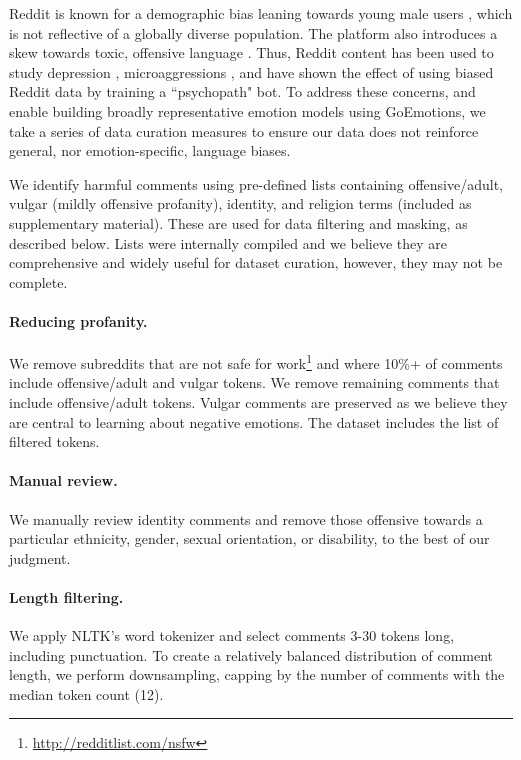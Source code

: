\documentclass[11pt,a4paper]{article}
\begin{document}
Reddit is known for a demographic bias leaning towards young male users \citep{duggan20136}, which is not reflective of a globally diverse population. 
The platform also introduces a skew towards toxic, offensive language \citep{mohan2017impact}. Thus, Reddit content has been used to study depression \citep{pirina2018identifying}, microaggressions \citep{breitfeller2019finding}, 
and \citet{Yanardag2019norman} have shown the effect of using biased Reddit data by training a ``psychopath" bot. To address these concerns, and enable building broadly representative emotion models using GoEmotions, we take a series of data curation measures to ensure our data does not reinforce general, nor emotion-specific, language biases.

We identify harmful comments using pre-defined lists  containing offensive/adult, vulgar (mildly offensive profanity), identity, and religion terms (included as supplementary material). These are used for data filtering and masking, as described below.
Lists were internally compiled and we believe they are comprehensive and widely useful for dataset curation, however, they may not be complete.

\paragraph{Reducing profanity.}  We remove subreddits that are not safe for work\footnote{\url{http://redditlist.com/nsfw}} and where 10\%+ of comments include offensive/adult and vulgar tokens. We remove remaining comments that include offensive/adult tokens. Vulgar comments are preserved as  we believe they are central to learning about negative emotions. The dataset includes the list of filtered tokens.


\paragraph{Manual review.} We manually review identity comments and remove those offensive towards a particular ethnicity, gender, sexual orientation, or disability, to the best of our judgment.

\paragraph{Length filtering.} We apply NLTK's word tokenizer and select comments 3-30 tokens long, including punctuation. To create a relatively balanced distribution of comment length, we perform downsampling, capping by the number of comments with the median token count (12).
\end{document}

